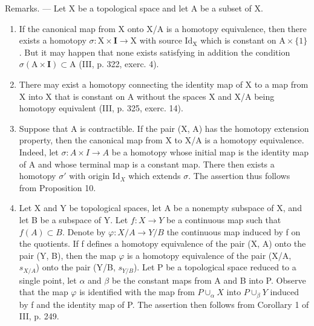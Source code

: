 Remarks. --- Let X be a topological space and let A be a subset of X.

\begin{enumerate}
\def\labelenumi{\arabic{enumi})}
\item
  If the canonical map from X onto X/A is a homotopy equivalence, then there exists a homotopy \(\sigma\colon\mathrm{X}\times\mathbf{I}\to\mathrm{X}\) with source \(\mathrm{Id}_{\mathrm{X}}\) which is constant on \(\mathrm{A}\times\{1\}\). But it may happen that none exists satisfying in addition the condition \(\sigma(\mathrm{A}\times\mathbf{I})\subset\mathrm{A}\) (III, p. 322, exerc. 4).
\item
  There may exist a homotopy connecting the identity map of X to a map from X into X that is constant on A without the spaces X and X/A being homotopy equivalent (III, p. 325, exerc. 14).
\item
  Suppose that A is contractible. If the pair (X, A) has the homotopy extension property, then the canonical map from X to X/A is a homotopy equivalence. Indeed, let \(\sigma\colon A \times I \to A\) be a homotopy whose initial map is the identity map of A and whose terminal map is a constant map. There then exists a homotopy \(\sigma'\) with origin \(\mathrm{Id}_{X}\) which extends \(\sigma\). The assertion thus follows from Proposition 10.
\item
  Let X and Y be topological spaces, let A be a nonempty subspace of X, and let B be a subspace of Y. Let \(f: X \to Y\) be a continuous map such that \(f(A) \subset B\). Denote by \(\varphi: X/A \to Y/B\) the continuous map induced by f on the quotients. If f defines a homotopy equivalence of the pair (X, A) onto the pair (Y, B), then the map \(\varphi\) is a homotopy equivalence of the pair (X/A, \(s_{X/A}\)) onto the pair (Y/B, \(s_{Y/B}\)). Let P be a topological space reduced to a single point, let \(\alpha\) and \(\beta\) be the constant maps from A and B into P. Observe that the map \(\varphi\) is identified with the map from \(P \cup_{\alpha} X\) into \(P \cup_{\beta} Y\) induced by f and the identity map of P. The assertion then follows from Corollary 1 of III, p. 249.
\end{enumerate}

